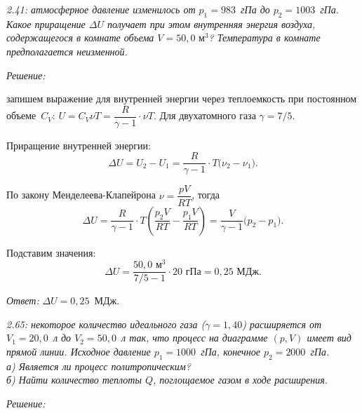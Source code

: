 \documentclass[pscyr]{hedwork}
\begin{document}
\maketitle


\emph{2.41: атмосферное давление изменилось от \( p_1 = 983 \)~гПа до
\( p_2 = 1003 \)~гПа. Какое приращение \( \Delta U \) получает при этом
внутренняя энергия воздуха, содержащегося в комнате объема
\( V = 50,\!0 \text{ м}^3\)? Температура в комнате предполагается неизменной.}

\vspace*{2em}
\emph{Решение:}

запишем выражение для внутренней энергии через теплоемкость при постоянном
объеме~\( C_V \): \( U = C_V \nu T = \dfrac{R}{\gamma - 1}\cdot\nu T \). Для
двухатомного газа \( \gamma = 7/5 \).

Приращение внутренней энергии:
\[
  \Delta U = U_2 - U_1 = \frac{R}{\gamma - 1}\cdot T\big( \nu_2 - \nu_1 \big).
\]

По закону Менделеева-Клапейрона \( \nu = \dfrac{pV}{RT} \), тогда
\[
  \Delta U = \frac{R}{\gamma - 1}\cdot T\left( \frac{p_2V}{RT} -
  \frac{p_1V}{RT} \right) = \frac{V}{\gamma - 1}\big( p_2 - p_1 \big).
\]

Подставим значения:
\[
  \Delta U = \frac{50,\!0 \text{ м}^3}{7/5 - 1}\cdot 20 \text{ гПа} =
  0,\!25 \text{ МДж}.
\]

\vspace*{2em}
\emph{Ответ:} \( \Delta U = 0,\!25\)~МДж.

\newpage %

\emph{2.65: некоторое количество идеального газа (\( \gamma = 1,\!40 \))
расширяется от \( V_1 = 20,\!0 \)~л до \( V_2 = 50,\!0 \)~л так, что процесс на
диаграмме \( (p, V) \) имеет вид прямой линии. Исходное давление
\( p_1 = 1000 \)~гПа, конечное \( p_2 = 2000 \)~гПа.\\
а) Является ли процесс политропическим?\\
б) Найти количество теплоты \( Q \), поглощаемое газом в ходе расширения.}

\vspace*{2em}
\emph{Решение:}
\end{document}
